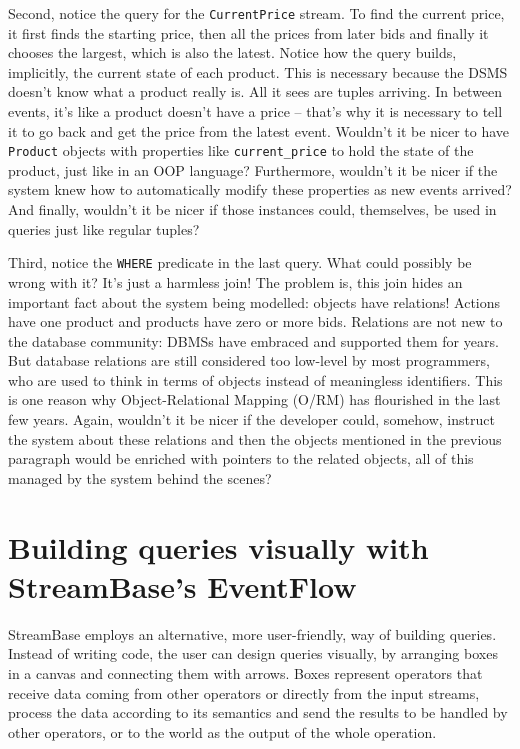 \documentclass{report}
\begin{document}
Second, notice the query for the \verb=CurrentPrice= stream. To find the current price, it first finds the starting price, then all the prices from later bids and finally it chooses the largest, which is also the latest. Notice how the query builds, implicitly, the current state of each product. This is necessary because the DSMS doesn't know what a product really is. All it sees are tuples arriving. In between events, it's like a product doesn't have a price -- that's why it is necessary to tell it to go back and get the price from the latest event. Wouldn't it be nicer to have \verb=Product= objects with properties like \verb=current_price= to hold the state of the product, just like in an OOP language? Furthermore, wouldn't it be nicer if the system knew how to automatically modify these properties as new events arrived? And finally, wouldn't it be nicer if those instances could, themselves, be used in queries just like regular tuples?

Third, notice the \verb=WHERE= predicate in the last query. What could possibly be wrong with it? It's just a harmless join! The problem is, this join hides an important fact about the system being modelled: objects have relations! Actions have one product and products have zero or more bids. Relations are not new to the database community: DBMSs have embraced and supported them for years. But database relations are still considered too low-level by most programmers, who are used to think in terms of objects instead of meaningless identifiers. This is one reason why Object-Relational Mapping (O/RM) has flourished in the last few years. Again, wouldn't it be nicer if the developer could, somehow, instruct the system about these relations and then the objects mentioned in the previous paragraph would be enriched with pointers to the related objects, all of this managed by the system behind the scenes?

\section{Building queries visually with StreamBase's EventFlow}

StreamBase employs an alternative, more user-friendly, way of building queries. Instead of writing code, the user can design queries visually, by arranging boxes in a canvas and connecting them with arrows. Boxes represent operators that receive data coming from other operators or directly from the input streams, process the data according to its semantics and send the results to be handled by other operators, or to the world as the output of the whole operation.
\end{document}

